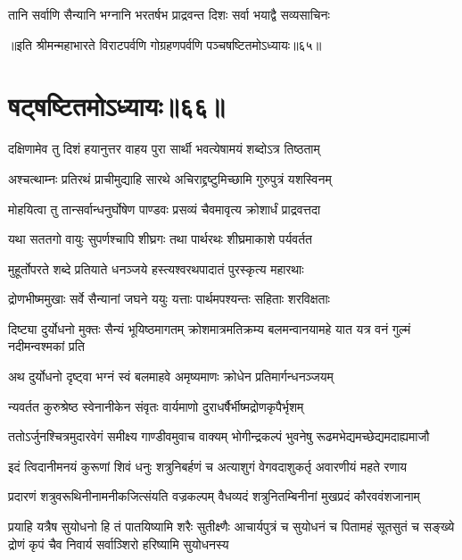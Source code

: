 \twolineshloka
{तानि सर्वाणि सैन्यानि भग्नानि भरतर्षभ}
{प्राद्रवन्त दिशः सर्वा भयाद्वै सव्यसाचिनः}

॥इति श्रीमन्महाभारते विराटपर्वणि गोग्रहणपर्वणि पञ्चषष्टितमोऽध्यायः॥६५॥

\chapter{षट्षष्टितमोऽध्यायः॥६६॥}

\twolineshloka
{दक्षिणामेव तु दिशं हयानुत्तर वाहय}
{पुरा सार्थी भवत्येषामयं शब्दोऽत्र तिष्ठताम्}


\twolineshloka
{अश्चत्थाम्नः प्रतिरथं प्राचीमुद्याहि सारथे}
{अचिराद्द्रष्टुमिच्छामि गुरुपुत्रं यशस्विनम्}



\twolineshloka
{मोहयित्वा तु तान्सर्वान्धनुर्घोषेण पाण्डवः}
{प्रसव्यं चैवमावृत्य क्रोशार्धं प्राद्रवत्तदा}


\twolineshloka
{यथा सततगो वायुः सुपर्णश्चापि शीघ्रगः}
{तथा पार्थरथः शीघ्रमाकाशे पर्यवर्तत}


\twolineshloka
{मुहूर्तोपरते शब्दे प्रतियाते धनञ्जये}
{हस्त्यश्वरथपादातं पुरस्कृत्य महारथाः}


\twolineshloka
{द्रोणभीष्ममुखाः सर्वे सैन्यानां जघने ययुः}
{यत्ताः पार्थमपश्यन्तः सहिताः शरविक्षताः}




\threelineshloka
{दिष्ट्या दुर्योधनो मुक्तः सैन्यं भूयिष्ठमागतम्}
{क्रोशमात्रमतिक्रम्य बलमन्वानयामहे}
{यात यत्र वनं गुल्मं नदीमन्वश्मकां प्रति}



\twolineshloka
{अथ दुर्योधनो दृष्ट्वा भग्नं स्वं बलमाहवे}
{अमृष्यमाणः क्रोधेन प्रतिमार्गन्धनञ्जयम्}


\twolineshloka
{न्यवर्तत कुरुश्रेष्ठ स्वेनानीकेन संवृतः}
{वार्यमाणो दुराधर्षैर्भीष्मद्रोणकृपैर्भृशम्}


\twolineshloka
{ततोऽर्जुनश्चित्रमुदारवेगं समीक्ष्य गाण्डीवमुवाच वाक्यम्}
{भोगीन्द्रकल्पं भुवनेषु रूढमभेद्यमच्छेद्यमदाह्यमाजौ}


\twolineshloka
{इदं त्विदानीमनयं कुरूणां शिवं धनुः शत्रुनिबर्हणं च}
{अत्याशुगं वेगवदाशुकर्तृ अवारणीयं महते रणाय}


\twolineshloka
{प्रदारणं शत्रुवरूथिनीनामनीकजित्संयति वज्रकल्पम्}
{वैधव्यदं शत्रुनितम्बिनीनां मुखप्रदं कौरववंशजानाम्}


\threelineshloka
{प्रयाहि यत्रैष सुयोधनो हि तं पातयिष्यामि शरैः सुतीक्ष्णैः}
{आचार्यपुत्रं च सुयोधनं च पितामहं सूतसुतं च सङ्ख्ये}
{द्रोणं कृपं चैव निवार्य सर्वाञ्शिरो हरिष्यामि सुयोधनस्य}


